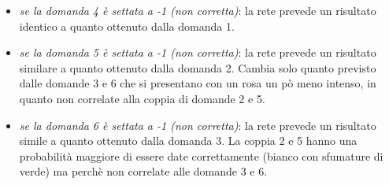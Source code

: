 \begin{itemize}
\begin{itemize}
\item \textit{se la domanda 4 \`e settata a -1 (non corretta)}: la rete prevede un risultato  identico a quanto ottenuto dalla domanda 1.
\item \textit{se la domanda 5 \`e settata a -1 (non corretta)}: la rete prevede un risultato similare a quanto ottenuto dalla domanda 2. Cambia solo quanto previsto dalle domande 3 e 6 che si presentano con un rosa un p\`o meno intenso, in quanto non  correlate alla coppia di domande 2 e 5.
\item \textit{se la domanda 6 \`e settata a -1 (non corretta)}: la rete prevede un risultato simile a quanto ottenuto dalla domanda 3. La coppia 2 e 5 hanno una probabilit\`a maggiore di essere date correttamente (bianco con sfumature di verde) ma perch\`e non correlate alle domande 3 e 6.
\end{itemize}
\end{itemize}

